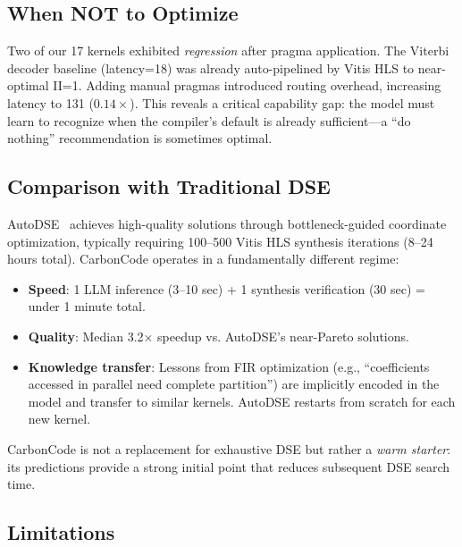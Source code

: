 \documentclass[conference]{IEEEtran}
\begin{document}
\subsection{When NOT to Optimize}

Two of our 17 kernels exhibited \emph{regression} after pragma application.
The Viterbi decoder baseline (latency=18) was already auto-pipelined by
Vitis HLS to near-optimal II=1. Adding manual pragmas introduced routing
overhead, increasing latency to 131 ($0.14\times$). This reveals a
critical capability gap: the model must learn to recognize when the
compiler's default is already sufficient---a ``do nothing'' recommendation
is sometimes optimal.

\subsection{Comparison with Traditional DSE}

AutoDSE~\cite{autodse} achieves high-quality solutions through
bottleneck-guided coordinate optimization, typically requiring 100--500
Vitis HLS synthesis iterations (8--24 hours total). CarbonCode operates
in a fundamentally different regime:

\begin{itemize}
    \item \textbf{Speed}: 1 LLM inference (3--10 sec) + 1 synthesis
    verification (30 sec) = under 1 minute total.
    \item \textbf{Quality}: Median 3.2$\times$ speedup vs. AutoDSE's
    near-Pareto solutions.
    \item \textbf{Knowledge transfer}: Lessons from FIR optimization
    (e.g., ``coefficients accessed in parallel need complete partition'')
    are implicitly encoded in the model and transfer to similar kernels.
    AutoDSE restarts from scratch for each new kernel.
\end{itemize}

CarbonCode is not a replacement for exhaustive DSE but rather a
\emph{warm starter}: its predictions provide a strong initial point
that reduces subsequent DSE search time.

\subsection{Limitations}
\end{document}
